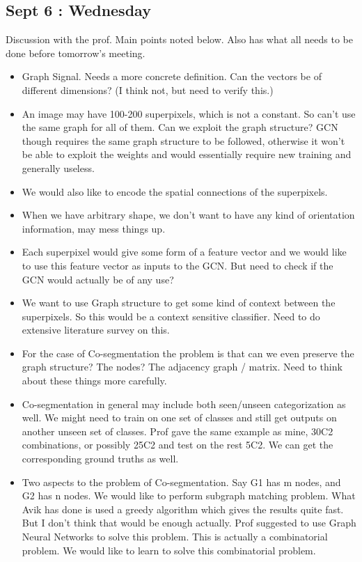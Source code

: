 \documentclass{article}
\begin{document}
\subsection{Sept 6 : Wednesday}
Discussion with the prof. Main points noted below. Also has what all needs to be done before tomorrow's meeting.
\begin{itemize}
\item Graph Signal. Needs a more concrete definition. Can the vectors be of different dimensions? (I think not, but need to verify this.)
\item An image may have 100-200 superpixels, which is not a constant. So can't use the same graph for all of them. Can we exploit the graph structure? GCN though requires the same graph structure to be followed, otherwise it won't be able to exploit the weights and would essentially require new training and generally useless.
\item We would also like to encode the spatial connections of the superpixels.
\item When we have arbitrary shape, we don't want to have any kind of orientation information, may mess things up.
\item Each superpixel would give some form of a feature vector and we would like to use this feature vector as inputs to the GCN. But need to check if the GCN would actually be of any use?
\item We want to use Graph structure to get some kind of context between the superpixels. So this would be a context sensitive classifier. Need to do extensive literature survey on this.
\item For the case of Co-segmentation the problem is that can we even preserve the graph structure? The nodes? The adjacency graph / matrix. Need to think about these things more carefully.
\item Co-segmentation in general may include both seen/unseen categorization as well. We might need to train on one set of classes and still get outputs on another unseen set of classes. Prof gave the same example as mine, 30C2 combinations, or possibly 25C2 and test on the rest 5C2. We can get the corresponding ground truths as well.
\item Two aspects to the problem of Co-segmentation. Say G1 has m nodes, and G2 has n nodes. We would like to perform subgraph matching problem. What Avik has done is used a greedy algorithm which gives the results quite fast. But I don't think that would be enough actually. Prof suggested to use Graph Neural Networks to solve this problem. This is actually a combinatorial problem. We would like to learn to solve this combinatorial problem.

\end{itemize}
\end{document}
